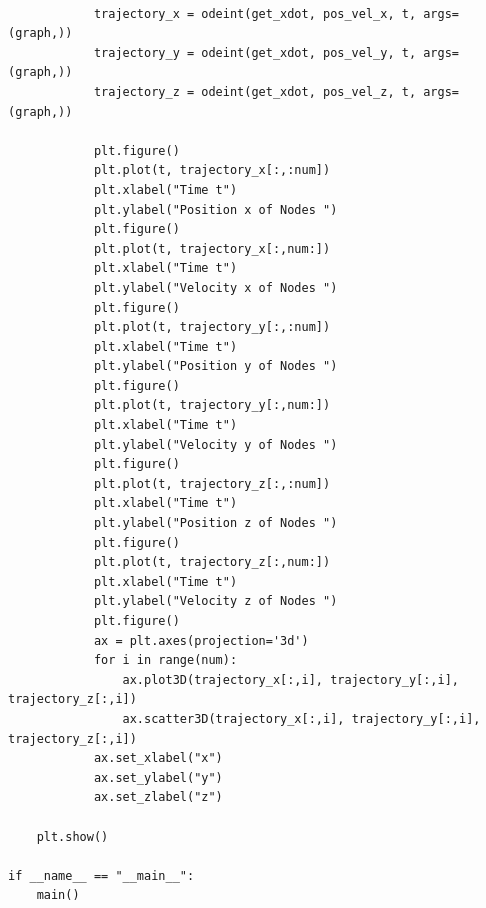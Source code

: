 \documentclass{article}
\begin{document}
\begin{verbatim}
            
            trajectory_x = odeint(get_xdot, pos_vel_x, t, args=(graph,))
            trajectory_y = odeint(get_xdot, pos_vel_y, t, args=(graph,))
            trajectory_z = odeint(get_xdot, pos_vel_z, t, args=(graph,))

            plt.figure()
            plt.plot(t, trajectory_x[:,:num])
            plt.xlabel("Time t")
            plt.ylabel("Position x of Nodes ")
            plt.figure()
            plt.plot(t, trajectory_x[:,num:])
            plt.xlabel("Time t")
            plt.ylabel("Velocity x of Nodes ")
            plt.figure()
            plt.plot(t, trajectory_y[:,:num])
            plt.xlabel("Time t")
            plt.ylabel("Position y of Nodes ")
            plt.figure()
            plt.plot(t, trajectory_y[:,num:])
            plt.xlabel("Time t")
            plt.ylabel("Velocity y of Nodes ")
            plt.figure()
            plt.plot(t, trajectory_z[:,:num])
            plt.xlabel("Time t")
            plt.ylabel("Position z of Nodes ")
            plt.figure()
            plt.plot(t, trajectory_z[:,num:])
            plt.xlabel("Time t")
            plt.ylabel("Velocity z of Nodes ")
            plt.figure()
            ax = plt.axes(projection='3d')
            for i in range(num):
                ax.plot3D(trajectory_x[:,i], trajectory_y[:,i], trajectory_z[:,i])
                ax.scatter3D(trajectory_x[:,i], trajectory_y[:,i], trajectory_z[:,i])
            ax.set_xlabel("x")
            ax.set_ylabel("y")
            ax.set_zlabel("z")

    plt.show()

if __name__ == "__main__":
    main()
\end{verbatim}
\end{document}
